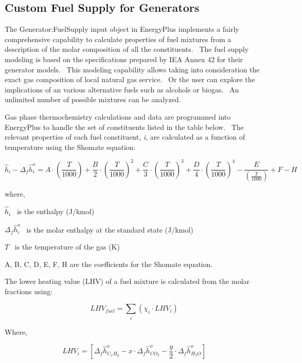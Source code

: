 \subsection{Custom Fuel Supply for Generators}\label{custom-fuel-supply-for-generators}

The Generator:FuelSupply input object in EnergyPlus implements a fairly comprehensive capability to calculate properties of fuel mixtures from a description of the molar composition of all the constituents.~ The fuel supply modeling is based on the specifications prepared by IEA Annex 42 for their generator models.~ This modeling capability allows taking into consideration the exact gas composition of local natural gas service.~ Or the user can explore the implications of an various alternative fuels such as alcohols or biogas.~ An unlimited number of possible mixtures can be analyzed.

Gas phase thermochemistry calculations and data are programmed into EnergyPlus to handle the set of constituents listed in the table below.~ The relevant properties of each fuel constituent, \emph{i}, are calculated as a function of temperature using the Shomate equation:

\begin{equation}
{\hat h_i} - {\Delta_f}\hat h_i^o = A \cdot \left( {\frac{T}{{1000}}} \right) + \frac{B}{2} \cdot {\left( {\frac{T}{{1000}}} \right)^2} + \frac{C}{3} \cdot {\left( {\frac{T}{{1000}}} \right)^3} + \frac{D}{4} \cdot {\left( {\frac{T}{{1000}}} \right)^4} - \frac{E}{{\left( {\frac{T}{{1000}}} \right)}} + F - H
\end{equation}

where,

\({\hat h_i}\) ~is the enthalpy (J/kmol)

\({\Delta_f}\hat h_i^o\) ~is the molar enthalpy at the standard state (J/kmol)

\(T\) ~is the temperature of the gas (K)

A, B, C, D, E, F, H are the coefficients for the Shomate equation.

The lower heating value (LHV) of a fuel mixture is calculated from the molar fractions using:

\begin{equation}
LH{V_{fuel}} = \sum\limits_i {\left( {{\chi_i} \cdot LH{V_i}} \right)}
\end{equation}

Where,

\begin{equation}
LH{V_i} = \left[ {{\Delta_f}\hat h_{{C_x}{H_y}}^o - x \cdot {\Delta_f}\hat h_{C{O_2}}^o - \frac{y}{2} \cdot {\Delta_f}\hat h_{{H_2}O}^o} \right]
\end{equation}


